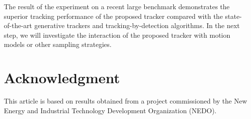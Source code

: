 \documentclass[10pt, conference, compsocconf]{IEEEtran}
\begin{document}
The result of the experiment on a recent large benchmark \cite{wu2013online} demonstrates the superior tracking performance of the proposed tracker compared with the state-of-the-art generative trackers and tracking-by-detection algorithms. In the next step, we will investigate the interaction of the proposed tracker with motion models or other sampling strategies.   

\section*{Acknowledgment}
This article is based on results obtained from a project commissioned by the New Energy and Industrial Technology Development Organization (NEDO).




\def\IEEEbibitemsep{3.9pt plus 1pt}

\end{document}
